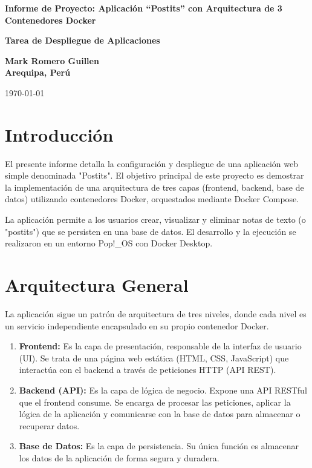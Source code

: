 \documentclass[12pt, a4paper]{article}
\begin{document}
\begin{titlepage}
    \centering
    \vspace*{1cm}
    \Huge\textbf{Informe de Proyecto: Aplicación ``Postits'' con Arquitectura de 3 Contenedores Docker}
    
    \vspace{1.5cm}
    \Large\textbf{Tarea de Despliegue de Aplicaciones}
    
    \vspace{2cm}
    
    \vfill
    
    \large
    \textbf{Mark Romero Guillen} \\
    \textbf{Arequipa, Perú}
    
    \vspace{1cm}
    \large
    \today
\end{titlepage}

\tableofcontents
\newpage

\section{Introducción}
El presente informe detalla la configuración y despliegue de una aplicación web simple denominada "Postits". El objetivo principal de este proyecto es demostrar la implementación de una arquitectura de tres capas (frontend, backend, base de datos) utilizando contenedores Docker, orquestados mediante Docker Compose.

La aplicación permite a los usuarios crear, visualizar y eliminar notas de texto (o "postits") que se persisten en una base de datos. El desarrollo y la ejecución se realizaron en un entorno Pop!\_OS con Docker Desktop.

\section{Arquitectura General}
La aplicación sigue un patrón de arquitectura de tres niveles, donde cada nivel es un servicio independiente encapsulado en su propio contenedor Docker.

\begin{enumerate}
    \item \textbf{Frontend:} Es la capa de presentación, responsable de la interfaz de usuario (UI). Se trata de una página web estática (HTML, CSS, JavaScript) que interactúa con el backend a través de peticiones HTTP (API REST).
    \item \textbf{Backend (API):} Es la capa de lógica de negocio. Expone una API RESTful que el frontend consume. Se encarga de procesar las peticiones, aplicar la lógica de la aplicación y comunicarse con la base de datos para almacenar o recuperar datos.
    \item \textbf{Base de Datos:} Es la capa de persistencia. Su única función es almacenar los datos de la aplicación de forma segura y duradera.
\end{enumerate}
\end{document}
